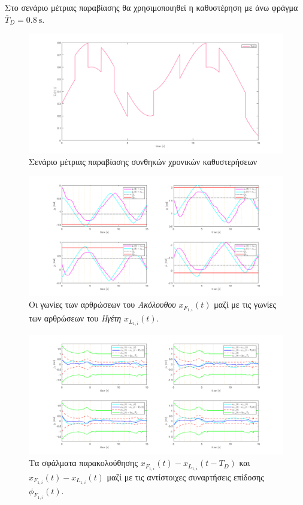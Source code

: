 \bigskip
Στο σενάριο μέτριας παραβίασης θα χρησιμοποιηθεί η καθυστέρηση με άνω φράγμα $\bar{T}_{D} = 0.8\ \text{s}$.

\begin{figure}[H]
    \centering
    \includegraphics[width=1\linewidth]{Chapters/Chapter3/Figures/Sim2Fig1.png}
    \caption[Σενάριος μέτρια παραβίασης συνθηκών χρονικών καθυστερήσεων]{Σενάριο μέτριας παραβίασης συνθηκών χρονικών καθυστερήσεων}
    \label{Sim2Fig1}
\end{figure}

\begin{figure}[H]
    \centering
    \includegraphics[width=1\linewidth]{Chapters/Chapter3/Figures/Sim2Fig2.png}
    \caption{Οι γωνίες των αρθρώσεων του \textit{Ακόλουθου} $x_{F_{1,i}}(t)$ μαζί με τις γωνίες των αρθρώσεων του \textit{Ηγέτη} $x_{L_{1,i}}(t)$.}
    \label{Sim2Fig2}
\end{figure}

\begin{figure}[H]
    \centering
    \includegraphics[width=1\linewidth]{Chapters/Chapter3/Figures/Sim2Fig3.png}
    \caption{Τα σφάλματα παρακολούθησης $x_{F_{1,i}}(t) - x_{L_{1,i}}(t - T_{D})$ και $x_{F_{1,i}}(t) - x_{L_{1,i}}(t)$ μαζί με τις αντίστοιχες συναρτήσεις επίδοσης $\phi_{F_{1,i}}(t)$.}
    \label{Sim2Fig3}
\end{figure}

